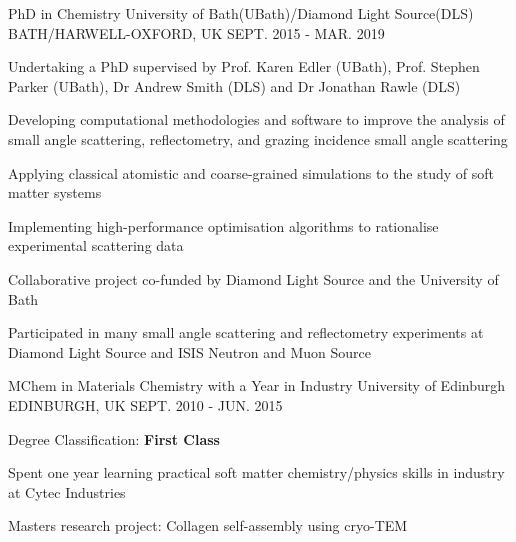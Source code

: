 \begin{cventries}
  \cventry
    {PhD in Chemistry}
    {University of Bath(UBath)/Diamond Light Source(DLS)}
    {BATH/HARWELL-OXFORD, UK}
    {SEPT. 2015 - MAR. 2019}
    {
      \begin{cvitems}
        \item {Undertaking a PhD supervised by Prof. Karen Edler (UBath), Prof. Stephen Parker (UBath), Dr Andrew Smith (DLS) and Dr Jonathan Rawle (DLS)}
        \item {Developing computational methodologies and software to improve the analysis of small angle scattering, reflectometry, and grazing incidence small angle scattering}
        \item {Applying classical atomistic and coarse-grained simulations to the study of soft matter systems}
        \item {Implementing high-performance optimisation algorithms to rationalise experimental scattering data}
        \item {Collaborative project co-funded by Diamond Light Source and the University of Bath}
        \item {Participated in many small angle scattering and reflectometry experiments at Diamond Light Source and ISIS Neutron and Muon Source}
      \end{cvitems}
    }
  \cventry
    {MChem in Materials Chemistry with a Year in Industry}
    {University of Edinburgh}
    {EDINBURGH, UK}
    {SEPT. 2010 - JUN. 2015}
    {
      \begin{cvitems}
        \item {Degree Classification: \textbf{First Class}}
        \item {Spent one year learning practical soft matter chemistry/physics skills in industry at Cytec Industries}
        \item {Masters research project: Collagen self-assembly using cryo-TEM}
      \end{cvitems}
    }
\end{cventries}
